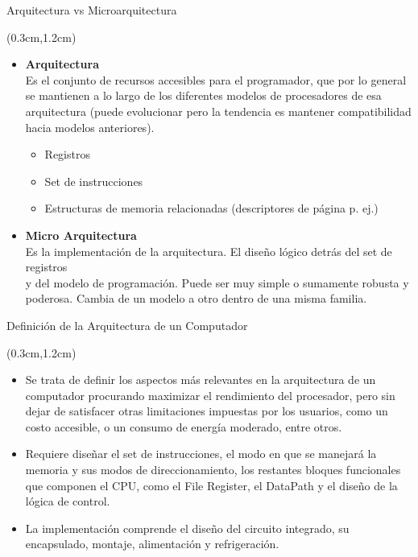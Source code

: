 \documentclass[table,dvipsnames,aspectratio=169]{beamer}
\begin{document}
\begin{frame}{Arquitectura vs Microarquitectura}
 \begin{textblock*}{\textwidth}(0.3cm,1.2cm)
  \begin{itemize}[<+->]\justifying \parskip 0.2cm
  \item \textcolor{furfiBlue}{\textbf{Arquitectura}}\\
  Es el conjunto de \textcolor{furfiBlue}{recursos accesibles para el programador}, que por lo general\\
  se mantienen a lo largo de los diferentes modelos de procesadores de esa\\
  arquitectura {\small (puede evolucionar pero la tendencia es mantener compatibilidad hacia modelos anteriores)}.
  \begin{itemize}
    \item[-] Registros
    \item[-] Set de instrucciones
    \item[-] Estructuras de memoria relacionadas (descriptores de página p. ej.)
  \end{itemize}
  \item \textcolor{furfiBlue}{\textbf{Micro Arquitectura}}\\
  Es la \textcolor{furfiBlue}{implementación de la arquitectura}. El diseño lógico detrás del set de registros\\
  y del modelo de programación. Puede ser muy simple o sumamente robusta y\\
  poderosa. Cambia de un modelo a otro dentro de una misma familia.
  \end{itemize}
 \end{textblock*}
\end{frame}

\begin{frame}{Definición de la Arquitectura de un Computador}
 \begin{textblock*}{\textwidth}(0.3cm,1.2cm)
  \begin{itemize}[<+->]\justifying \parskip 0.3cm
   \item Se trata de definir los \textcolor{furfiBlue}{aspectos más relevantes} en la arquitectura de un computador procurando maximizar el rendimiento del procesador, pero sin dejar de satisfacer \textcolor{furfiBlue}{otras limitaciones impuestas} por los usuarios, como un costo accesible, o un consumo de energía moderado, entre otros.
   \item Requiere diseñar el \textcolor{furfiBlue}{set de instrucciones}, el \textcolor{furfiBlue}{modo en que se manejará la memoria} y sus \textcolor{furfiBlue}{modos de direccionamiento}, los restantes bloques funcionales que componen el CPU, como el \textcolor{furfiBlue}{File Register}, el \textcolor{furfiBlue}{DataPath} y el diseño de la \textcolor{furfiBlue}{lógica de control}.
   \item La implementación comprende \textcolor{furfiBlue}{el diseño del circuito integrado}, su encapsulado, montaje, alimentación y refrigeración.
  \end{itemize}
 \end{textblock*}
\end{frame}
\end{document}
